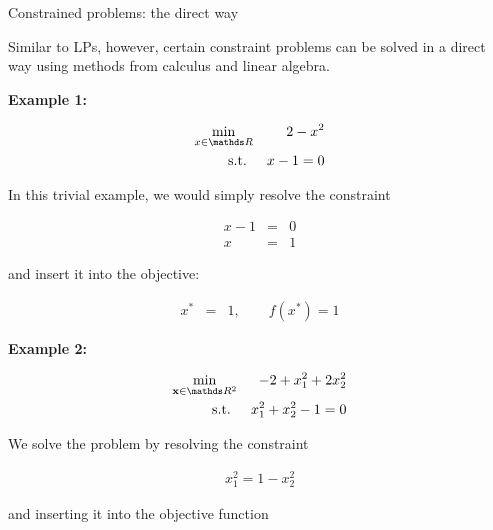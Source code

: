 \documentclass[11pt,compress,t,notes=noshow, xcolor=table]{beamer}
\begin{document}
\begin{vbframe}{Constrained problems: the direct way}

Similar to LPs, however, certain constraint problems can be solved in a direct way using methods from calculus and linear algebra.  

\textbf{Example 1:}

\begin{footnotesize}
\begin{eqnarray*}
\min_{x\in \R} && 2 - x^2 \\
\text{s.t. } && x - 1 = 0
\end{eqnarray*}
\end{footnotesize}

In this trivial example, we would simply resolve the constraint 

\begin{eqnarray*}
x - 1 &=& 0 \\
x &=& 1
\end{eqnarray*}

and insert it into the objective: 

\vspace*{-0.5cm}

\begin{eqnarray*}
x^\ast &=& 1, \qquad f(x^\ast) = 1
\end{eqnarray*}

\framebreak

\textbf{Example 2:}

     \vspace*{-0.5cm}

 \begin{footnotesize}
 \begin{eqnarray*}
 \min_{\xv \in \R^2} && - 2 + x_1^2 + 2 x_2^2\\
 \text{s.t. } && x_1^2 + x_2^2 - 1 = 0
 \end{eqnarray*}
 \end{footnotesize}

 \vspace*{-0.2cm}

 We solve the problem by resolving the constraint

 \begin{footnotesize}
 \begin{eqnarray*}
 x_1^2 = 1 - x_2^2
 \end{eqnarray*}
 \end{footnotesize}

 and inserting it into the objective function


\end{vbframe}
\end{document}
